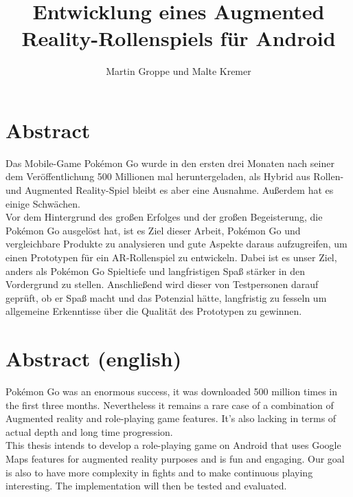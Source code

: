 \documentclass[extern,palatino]{cgBA}
\author{Martin Groppe und Malte Kremer}
\title{Entwicklung eines Augmented Reality-Rollenspiels für Android}
\begin{document}
	
	
	
	\maketitle
	
	\newpage
	
	\tableofcontents
	\clearpage         %
	
	
	\section{Abstract}
	
	Das Mobile-Game Pokémon Go wurde in den ersten drei Monaten nach seiner dem Veröffentlichung 500 Millionen mal heruntergeladen, als Hybrid aus Rollen- und Augmented Reality-Spiel bleibt es aber eine Ausnahme. Außerdem hat es einige Schwächen.
	\\Vor dem Hintergrund des großen Erfolges und der großen Begeisterung, die Pokémon Go ausgelöst hat, ist es Ziel dieser Arbeit, Pokémon Go und vergleichbare Produkte zu analysieren und gute Aspekte daraus aufzugreifen, um einen Prototypen für ein AR-Rollenspiel zu entwickeln. Dabei ist es unser Ziel, anders als Pokémon Go Spieltiefe und langfristigen Spaß stärker in den Vordergrund zu stellen.
	Anschließend wird dieser von Testpersonen darauf geprüft, ob er Spaß macht und das Potenzial hätte, langfristig zu fesseln um allgemeine Erkenntisse über die Qualität des Prototypen zu gewinnen.
	\section{Abstract (english)}
	Pokémon Go was an enormous success, it was downloaded 500 million times in the first three months. Nevertheless it remains a rare case of a combination of Augmented reality and role-playing game features. It's also lacking in terms of actual depth and long time progression.
	\\This thesis intends to develop a role-playing game on Android that uses Google Maps features for augmented reality purposes and is fun and engaging. Our goal is also to have more complexity in fights and to make continuous playing interesting. The implementation will then be tested and evaluated.
	\newpage
\end{document}

